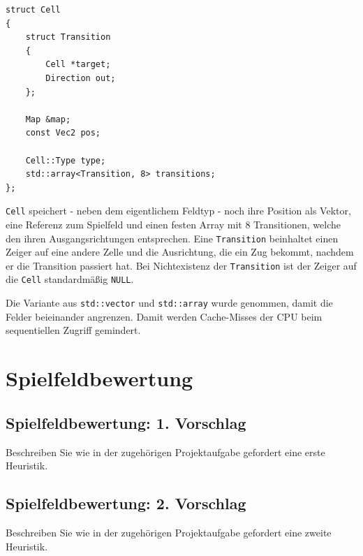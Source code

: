 \documentclass[12pt,a4paper]{article}
\begin{document}
\begin{lstlisting}[caption=\texttt{Cell} Struktur, label=lst:cell-struct]
struct Cell
{
	struct Transition
	{
		Cell *target;
		Direction out;
	};
	
	Map &map;
	const Vec2 pos;
	
	Cell::Type type;
	std::array<Transition, 8> transitions;
};
\end{lstlisting}

\texttt{Cell} speichert - neben dem eigentlichem Feldtyp - noch ihre Position als Vektor, eine Referenz zum Spielfeld und einen festen Array mit 8 Transitionen, welche den ihren Ausgangsrichtungen entsprechen.
Eine \texttt{Transition} beinhaltet einen Zeiger auf eine andere Zelle und die Ausrichtung, die ein Zug bekommt, nachdem er die Transition passiert hat.
Bei Nichtexistenz der \texttt{Transition} ist der Zeiger auf die \texttt{Cell} standardmäßig \texttt{NULL}.

Die Variante aus \texttt{std::vector} und \texttt{std::array} wurde genommen, damit die Felder beieinander angrenzen. Damit werden Cache-Misses der CPU beim sequentiellen Zugriff gemindert.




\newpage
\section{Spielfeldbewertung}
\subsection{Spielfeldbewertung: 1. Vorschlag}
Beschreiben Sie wie in der zugehörigen Projektaufgabe gefordert eine erste Heuristik.

\subsection{Spielfeldbewertung: 2. Vorschlag}
Beschreiben Sie wie in der zugehörigen Projektaufgabe gefordert eine zweite Heuristik.
\end{document}
